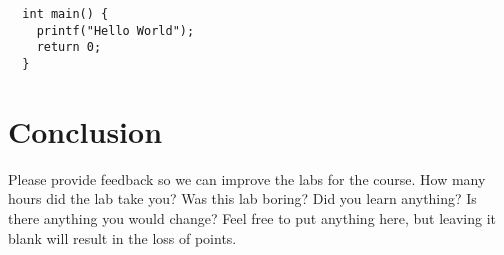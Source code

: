 \documentclass[11pt]{article}
\begin{document}
\begin{verbatim}
  int main() {
    printf("Hello World");
    return 0;
  }
\end{verbatim}

\section{Conclusion}
\label{sec:conclusion}
Please provide feedback so we can improve the labs for the course. How many
hours did the lab take you? Was this lab boring? Did you learn anything? Is
there anything you would change? Feel free to put anything here, but leaving it
blank will result in the loss of points.

% 
% 
\end{document}
